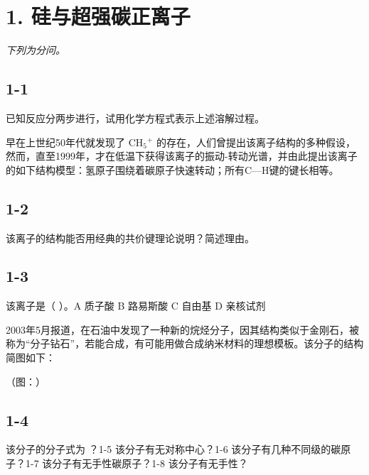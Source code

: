 \section*{1. 硅与超强碳正离子}
\textit{下列为分问。}

\subsection*{1-1}
已知反应分两步进⾏，试⽤化学⽅程式表⽰上述溶解过程。

早在上世纪50年代就发现了 $\mathrm { C H } _ { 5 } { } ^ { + }$ 的存在，⼈们曾提出该离⼦结构的多种假设，然⽽，直⾄1999年，才在低温下获得该离⼦的振动-转动光谱，并由此提出该离⼦的如下结构模型：氢原⼦围绕着碳原⼦快速转动；所有C—H键的键⻓相等。

\subsection*{1-2}
该离⼦的结构能否⽤经典的共价键理论说明？简述理由。

\subsection*{1-3}
该离⼦是（ ）。A 质⼦酸 B 路易斯酸 C ⾃由基 D 亲核试剂

2003年5⽉报道，在⽯油中发现了⼀种新的烷烃分⼦，因其结构类似于⾦刚⽯，被称为“分⼦钻⽯”，若能合成，有可能⽤做合成纳⽶材料的理想模板。该分⼦的结构简图如下：

（图：）

\subsection*{1-4}
该分⼦的分⼦式为 ？1-5 该分⼦有⽆对称中⼼？1-6 该分⼦有⼏种不同级的碳原⼦？1-7 该分⼦有⽆⼿性碳原⼦？1-8 该分⼦有⽆⼿性？
